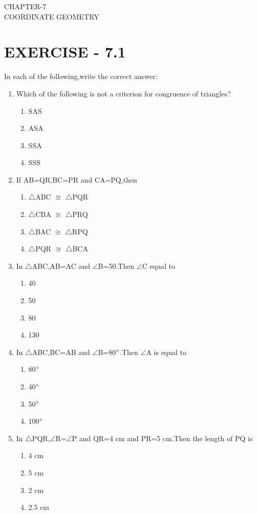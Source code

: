 \documentclass[12pt]{article}
\begin{document}
\begin{center}
\textbf\large{CHAPTER-7 \\ COORDINATE GEOMETRY}
\end{center}

\section*{EXERCISE - 7.1}
In each of the following,write the correct answer:
\begin{enumerate} 
\item Which of the following is not a criterion for congruence of triangles?
\begin{enumerate}
\item SAS 
\item ASA 
\item SSA 
\item SSS
\end{enumerate}
\item If AB=QR,BC=PR and CA=PQ,then
\begin{enumerate}
\item $\triangle$ABC $\cong$ $\triangle$PQR  \item $\triangle$CBA $\cong$ $\triangle$PRQ
\item $\triangle$BAC $\cong$ $\triangle$RPQ  \item $\triangle$PQR $\cong$ $\triangle$BCA
\end{enumerate}
\item In $\triangle$ABC,AB=AC and $\angle$B=50\degree.Then $\angle$C equal to
\begin{enumerate}\item 40\degree \item 50\degree \item 80\degree \item 130\degree\end{enumerate}
\item In $\triangle$ABC,BC=AB and $\angle$B=80$\degree$.Then $\angle$A is equal to 
\begin{enumerate}\item 80$\degree$ \item 40$\degree$ \item 50$\degree$ \item 100$\degree$\end{enumerate}
\item In $\triangle$PQR,$\angle$R=$\angle$P and QR=4 cm and PR=5 cm.Then the length of PQ is
\begin{enumerate}\item 4 cm \item 5 cm \item 2 cm \item 2.5 cm\end{enumerate}

\end{enumerate}
\end{document}
